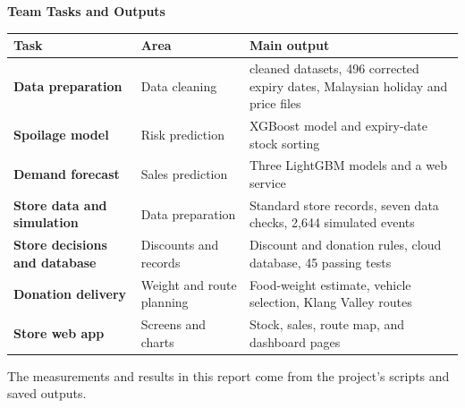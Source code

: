 \documentclass[12pt,a4paper]{article}
\renewcommand{\_}{\oldunderscore\allowbreak}
\begin{document}
\begin{titlepage}
    \vspace{4.5mm}
    {\small\bfseries\color{NavyPrimary}Team Tasks and Outputs}\\[3pt]
    \renewcommand{\arraystretch}{1.12}
    {\scriptsize
    \begin{tabularx}{\textwidth}{@{} >{\bfseries}l l >{\raggedright\arraybackslash}X @{}}
        \toprule
        \rowcolor{NavyPrimary}
        \color{white}\textbf{Task} & \color{white}\textbf{Area} & \color{white}\textbf{Main output} \\
        \midrule
        Data preparation & Data cleaning & 12 cleaned datasets, 496 corrected expiry dates, Malaysian holiday and price files \\
        \rowcolor{LightBg}
        Spoilage model & Risk prediction & XGBoost model and expiry-date stock sorting \\
        Demand forecast & Sales prediction & Three LightGBM models and a web service \\
        \rowcolor{LightBg}
        Store data and simulation & Data preparation & Standard store records, seven data checks, 2,644 simulated events \\
        Store decisions and database & Discounts and records & Discount and donation rules, cloud database, 45 passing tests \\
        \rowcolor{LightBg}
        Donation delivery & Weight and route planning & Food-weight estimate, vehicle selection, Klang Valley routes \\
        Store web app & Screens and charts & Stock, sales, route map, and dashboard pages \\
        \bottomrule
    \end{tabularx}}

    \vfill
    \begin{center}
        {\scriptsize\color{SlateMuted}The measurements and results in this report come from the project's scripts and saved outputs.}
    \end{center}
\end{titlepage}
\end{document}
